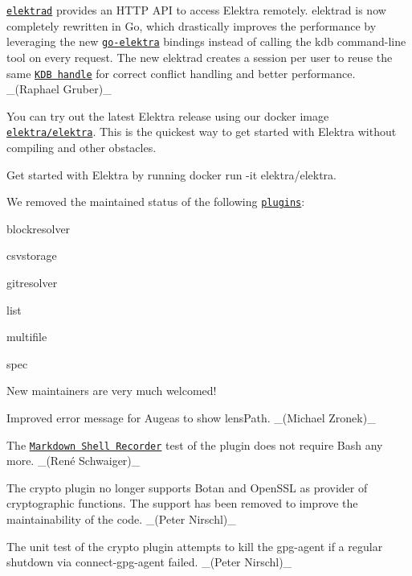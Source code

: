 \href{https://www.libelektra.org/tools/elektrad}{\tt elektrad} provides an H\+T\+TP A\+PI to access Elektra remotely. {\ttfamily elektrad} is now completely rewritten in Go, which drastically improves the performance by leveraging the new \href{https://github.com/ElektraInitiative/go-elektra/}{\tt go-\/elektra} bindings instead of calling the {\ttfamily kdb} command-\/line tool on every request. The new {\ttfamily elektrad} creates a session per user to reuse the same \href{https://doc.libelektra.org/api/current/html/group__kdb.html}{\tt K\+DB handle} for correct conflict handling and better performance. \+\_\+(\+Raphael Gruber)\+\_\+

You can try out the latest Elektra release using our docker image \href{https://hub.docker.com/r/elektra/elektra}{\tt elektra/elektra}. This is the quickest way to get started with Elektra without compiling and other obstacles.

Get started with Elektra by running {\ttfamily docker run -\/it elektra/elektra}.

We removed the {\ttfamily maintained} status of the following \href{https://www.libelektra.org/plugins/readme}{\tt plugins}\+:


\begin{DoxyItemize}
\item blockresolver
\item csvstorage
\item gitresolver
\item list
\item multifile
\item spec
\end{DoxyItemize}

New maintainers are very much welcomed!


\begin{DoxyItemize}
\item Improved error message for Augeas to show lens\+Path. \+\_\+(\+Michael Zronek)\+\_\+
\end{DoxyItemize}


\begin{DoxyItemize}
\item The \href{https://master.libelektra.org/tests/shell/shell_recorder/tutorial_wrapper}{\tt Markdown Shell Recorder} test of the plugin does not require Bash any more. \+\_\+(René Schwaiger)\+\_\+
\end{DoxyItemize}


\begin{DoxyItemize}
\item The crypto plugin no longer supports Botan and Open\+S\+SL as provider of cryptographic functions. The support has been removed to improve the maintainability of the code. \+\_\+(\+Peter Nirschl)\+\_\+
\item The unit test of the crypto plugin attempts to kill the gpg-\/agent if a regular shutdown via {\ttfamily connect-\/gpg-\/agent} failed. \+\_\+(\+Peter Nirschl)\+\_\+
\end{DoxyItemize}


